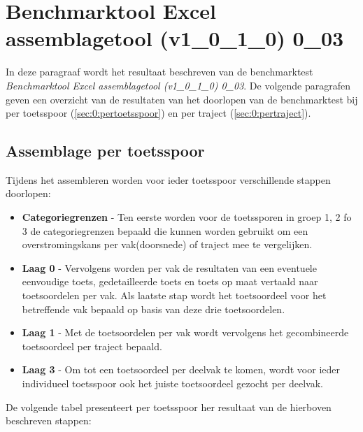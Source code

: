 \section{Benchmarktool Excel assemblagetool (v1\_0\_1\_0) 0\_03}
	\label{ch:benchmarktTest0}
In deze paragraaf wordt het resultaat beschreven van de benchmarktest \textit{Benchmarktool Excel assemblagetool (v1\_0\_1\_0) 0\_03}. De volgende paragrafen geven een overzicht van de resultaten van het doorlopen van de benchmarktest bij per toetsspoor (\autoref{sec:0:pertoetsspoor}) en per traject (\autoref{sec:0:pertraject}).

\subsection{Assemblage per toetsspoor}
	\label{sec:0:pertoetsspoor}
Tijdens het assembleren worden voor ieder toetsspoor verschillende stappen doorlopen:
\begin{itemize}
	\item \textbf{Categoriegrenzen} - Ten eerste worden voor de toetssporen in groep 1, 2 fo 3 de categoriegrenzen bepaald die kunnen worden gebruikt om een overstromingskans per vak(doorsnede) of traject mee te vergelijken.
	\item \textbf{Laag 0} - Vervolgens worden per vak de resultaten van een eventuele eenvoudige toets, gedetailleerde toets en toets op maat vertaald naar toetsoordelen per vak. Als laatste stap wordt het toetsoordeel voor het betreffende vak bepaald op basis van deze drie toetsoordelen.
	\item \textbf{Laag 1} - Met de toetsoordelen per vak wordt vervolgens het gecombineerde toetsoordeel per traject bepaald.
	\item \textbf{Laag 3} - Om tot een toetsoordeel per deelvak te komen, wordt voor ieder individueel toetsspoor ook het juiste toetsoordeel gezocht per deelvak.
\end{itemize}

De volgende tabel presenteert per toetsspoor her resultaat van de hierboven beschreven stappen:

